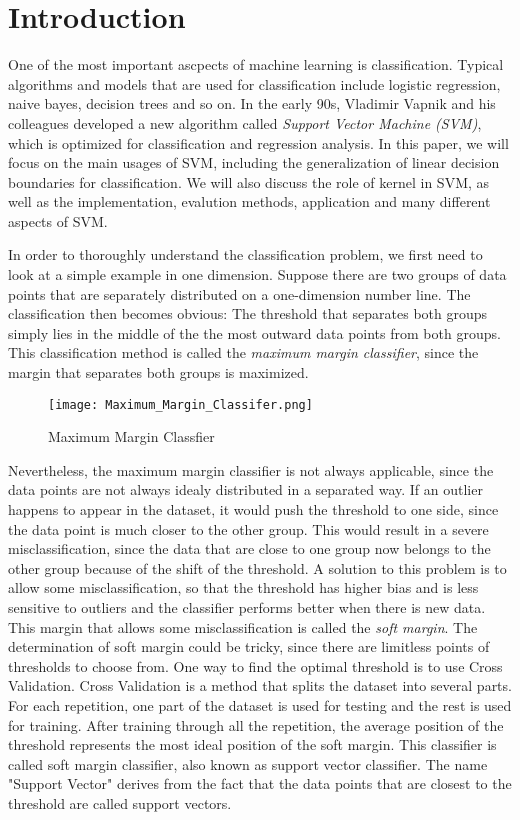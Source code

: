 
\section{Introduction}
One of the most important ascpects of machine learning is classification. Typical algorithms and models
that are used for classification include logistic regression, naive bayes, decision trees and so on. In the early 90s, 
Vladimir Vapnik and his colleagues developed a new algorithm called \emph{Support Vector Machine (SVM)}, which is optimized for classification and regression analysis. In this paper,
we will focus on the main usages of SVM, including the generalization of linear decision boundaries for classification.
We will also discuss the role of kernel in SVM, as well as the implementation, evalution methods, application and many
different aspects of SVM.

In order to thoroughly understand the classification problem, we first need to look at a simple example in one dimension.
Suppose there are two groups of data points that are separately distributed on a one-dimension number line. The classification then
becomes obvious: The threshold that separates both groups simply lies in the middle of the the most outward data points
from both groups. This classification method is called the \emph{maximum margin classifier}, since the margin that separates both
groups is maximized.

\begin{figure}[h]%
    \begin{center}%
        \texttt{[image: Maximum\_Margin\_Classifer.png]}%
        \caption{Maximum Margin Classfier}\label{fig:}%
    \end{center}%
\end{figure}

Nevertheless, the maximum margin classifier is not always applicable, since the data points are not always idealy distributed
in a separated way. If an outlier happens to appear in the dataset, it would push the threshold to one side, since the data point
is much closer to the other group. This would result in a severe misclassification, since the data that are close to one
group now belongs to the other group because of the shift of the threshold. A solution to this problem is to allow some
misclassification, so that the threshold has higher bias and is less sensitive to outliers and the classifier performs better
when there is new data. This margin that allows some misclassification is called the \emph{soft margin}. The determination of soft margin 
could be tricky, since there are limitless points of thresholds to choose from. One way to find the optimal threshold
is to use Cross Validation. Cross Validation is a method that splits the dataset into several parts. For each repetition, 
one part of the dataset is used for testing and the rest is used for training. After training through all the repetition, the 
average position of the threshold represents the most ideal position of the soft margin. This classifier is called
soft margin classifier, also known as support vector classifier. The name "Support Vector" derives from the fact that
the data points that are closest to the threshold are called support vectors.

